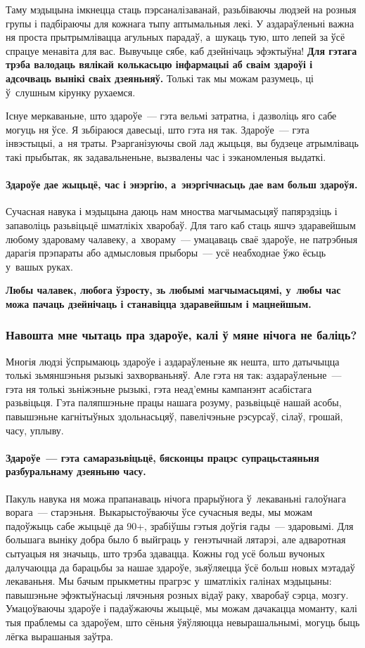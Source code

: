 Таму мэдыцына імкнецца стаць пэрсаналізаванай, разьбіваючы людзей на розныя групы і падбіраючы для кожнага тыпу аптымальныя лекі. У аздараўленьні важна ня проста прытрымлівацца агульных парадаў, а~шукаць тую, што лепей за ўсё спрацуе менавіта для вас. Вывучыце сябе, каб дзейнічаць эфэктыўна! \textbf{Для гэтага трэба валодаць вялікай колькасьцю інфармацыі аб сваім здароўі і адсочваць вынікі сваіх дзеяньняў.} Толькі так мы можам разумець, ці ў~слушным кірунку рухаемся.

Існуе меркаваньне, што здароўе~--- гэта вельмі затратна, і дазволіць яго сабе могуць ня ўсе. Я зьбіраюся давесьці, што гэта ня так. Здароўе~--- гэта інвэстыцыі, а~ня траты. Рэарганізуючы свой лад жыцьця, вы будзеце атрымліваць такі прыбытак, як задавальненьне, вызвалены час і зэканомленыя выдаткі.

\paragraph{Здароўе дае жыцьцё, час і энэргію, а~энэргічнасьць дае вам больш здароўя.} Сучасная навука і мэдыцына даюць нам мноства магчымасьцяў папярэдзіць і запаволіць разьвіцьцё шматлікіх хваробаў. Для таго каб стаць яшчэ здаравейшым любому здароваму чалавеку, а~хвораму~--- умацаваць сваё здароўе, не патрэбныя дарагія прэпараты або адмысловыя прыборы~--- усё неабходнае ўжо ёсьць у~вашых руках. 

\textbf{Любы чалавек, любога ўзросту, зь любымі магчымасьцямі, у~любы час можа пачаць дзейнічаць і станавіцца здаравейшым і мацнейшым.}

\subsubsection{Навошта мне чытаць пра здароўе, калі ў мяне нічога не баліць?}

Многія людзі ўспрымаюць здароўе і аздараўленьне як нешта, што датычыцца толькі зьмяншэньня рызыкі захворваньняў. Але гэта ня так: аздараўленьне~--- гэта ня толькі зьніжэньне рызыкі, гэта неад'емны кампанэнт асабістага разьвіцьця. Гэта паляпшэньне працы нашага розуму, разьвіцьцё нашай асобы, павышэньне кагнітыўных здольнасьцяў, павелічэньне рэсурсаў, сілаў, грошай, часу, уплыву.

\paragraph{Здароўе~--- гэта самаразьвіцьцё, бясконцы працэс супрацьстаяньня разбуральнаму дзеяньню часу.} Пакуль навука ня можа прапанаваць нічога прарыўнога ў~лекаваньні галоўнага ворага~--- старэньня. Выкарыстоўваючы ўсе сучасныя веды, мы можам падоўжыць сабе жыцьцё да 90+, зрабіўшы гэтыя доўгія гады~--- здаровымі. Для большага выніку добра было б выйграць у~генэтычнай лятарэі, але адваротная сытуацыя ня значыць, што трэба здавацца. Кожны год усё больш вучоных далучаюцца да барацьбы за нашае здароўе, зьяўляецца ўсё больш новых мэтадаў лекаваньня. Мы бачым прыкметны прагрэс у~шматлікіх галінах мэдыцыны: павышэньне эфэктыўнасьці лячэньня розных відаў раку, хваробаў сэрца, мозгу. Умацоўваючы здароўе і падаўжаючы жыцьцё, мы можам дачакацца моманту, калі тыя праблемы са здароўем, што сёньня ўяўляюцца невырашальнымі, могуць быць лёгка вырашаныя заўтра.

